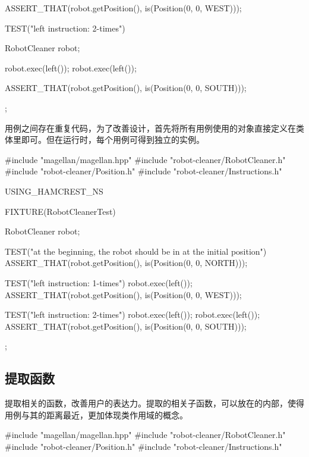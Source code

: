 \begin{content}
\begin{leftbar}
\begin{c++}[caption={test/robot-cleaner/RobotCleanerTest.cpp}]
{{        ASSERT_THAT(robot.getPosition(), is(Position(0, 0, WEST)));
    }

    TEST("left instruction: 2-times")
    {
        RobotCleaner robot;
        
        robot.exec(left());
        robot.exec(left());
        
        ASSERT_THAT(robot.getPosition(), is(Position(0, 0, SOUTH)));
    }
};
\end{c++}
\end{leftbar}

用例之间存在重复代码，为了改善设计，首先将所有用例使用的对象直接定义在类体里即可。但在运行时，每个用例可得到独立的实例。

\begin{leftbar}
\begin{c++}[caption={test/robot-cleaner/RobotCleanerTest.cpp}]
#include "magellan/magellan.hpp"
#include "robot-cleaner/RobotCleaner.h"
#include "robot-cleaner/Position.h"
#include "robot-cleaner/Instructions.h"

USING_HAMCREST_NS

FIXTURE(RobotCleanerTest)
{
    RobotCleaner robot;

    TEST("at the beginning, the robot should be in at the initial position")
    {
        ASSERT_THAT(robot.getPosition(), is(Position(0, 0, NORTH)));
    }

    TEST("left instruction: 1-times")
    {
        robot.exec(left());        
        ASSERT_THAT(robot.getPosition(), is(Position(0, 0, WEST)));
    }

    TEST("left instruction: 2-times")
    {
        robot.exec(left());
        robot.exec(left());        
        ASSERT_THAT(robot.getPosition(), is(Position(0, 0, SOUTH)));
    }
};
\end{c++}
\end{leftbar}

\subsection{提取函数}

提取相关的函数，改善用户的表达力。提取的相关子函数，可以放在的内部，使得用例与其的距离最近，更加体现类作用域的概念。

\begin{leftbar}
\begin{c++}[caption={test/robot-cleaner/RobotCleanerTest.cpp}]
#include "magellan/magellan.hpp"
#include "robot-cleaner/RobotCleaner.h"
#include "robot-cleaner/Position.h"
#include "robot-cleaner/Instructions.h"


\end{c++}
\end{leftbar}
\end{content}
